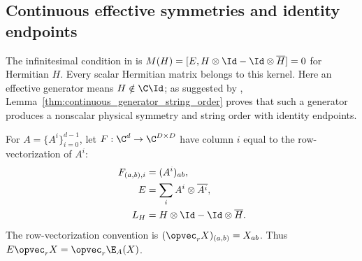 \subsection{Continuous effective symmetries and identity endpoints}
\label{sec:continuous_effective_string_order}

The infinitesimal condition in
\cite[lines~331--359]{PerezGarcia2008StringOrder} is
$M(H)=[E,H\otimes\Id-\Id\otimes\overline H]=0$ for Hermitian $H$.
Every scalar Hermitian matrix belongs to this kernel. Here an effective
generator means $H\notin\C\Id$; as suggested by
\cite[lines~291--296]{PerezGarcia2008StringOrder},
Lemma~\ref{thm:continuous_generator_string_order} proves that such a
generator produces a nonscalar physical symmetry and string order with
identity endpoints.

\begin{definition}
    \label{def:row_kraus_generator}
    \leanok
    For $A=\{A^i\}_{i=0}^{d-1}$, let $F:\C^d\to\C^{D\times D}$
    have column $i$ equal to the row-vectorization of $A^i$:
    \begin{align}
        F_{(a,b),i} & =(A^i)_{ab},\notag                      \\
        E           & =\sum_i A^i\otimes\overline{A^i},\notag \\
        L_H         & =H\otimes\Id-\Id\otimes\overline H.
        \label{eq:symmetry_row_generator}
    \end{align}
    The row-vectorization convention is $(\opvec_r X)_{(a,b)}=X_{ab}$.
    Thus $E\opvec_r X=\opvec_r\E_A(X)$.
\end{definition}

